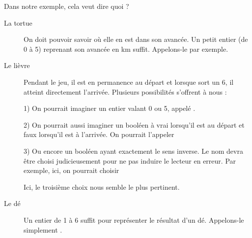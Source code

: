 			Dans notre exemple, cela veut dire quoi ?
			\begin{description}
			\item[La tortue]
				On doit pouvoir savoir où elle en est dans son avancée.
				Un petit entier (de 0 à 5) reprenant son avancée en km suffit.
				Appelons-le  par exemple.
			\item[Le lièvre]
				Pendant le jeu, il est en permanence au départ
				et lorsque sort un 6, il atteint directement l'arrivée.
				Plusieurs possibilités s'offrent à nous :
			
				1) On pourrait imaginer un entier valant 0 ou 5,
				appelé .

				2) On pourrait aussi imaginer un booléen à vrai 
				lorsqu'il est au départ et faux lorsqu'il est à l'arrivée.
				On pourrait l'appeler 

				3) Ou encore un booléen ayant exactement le sens inverse.
				Le nom devra être choisi judicieusement pour ne pas induire
				le lecteur en erreur.
				Par exemple, ici, on pourrait choisir 

				Ici, le troisième choix nous semble le plus pertinent.
			\item[Le dé]
				Un entier de 1 à 6 suffit pour représenter le résultat d'un dé.
				Appelons-le simplement .
				
				

\end{description}
